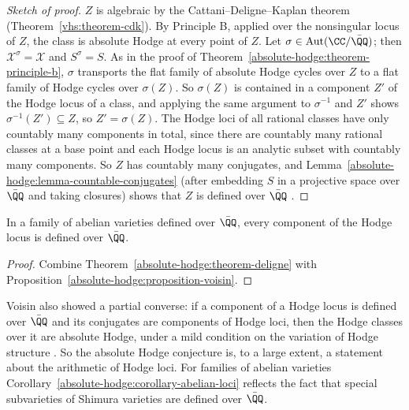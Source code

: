 \begin{proof}[Sketch of proof]
$Z$ is algebraic by the Cattani--Deligne--Kaplan theorem (Theorem~\ref{vhs:theorem-cdk}). By Principle B, applied over the nonsingular locus of $Z$, the class is absolute Hodge at every point of $Z$. Let
$\sigma \in \mathrm{Aut}(\CC/\bar{\QQ})$; then $\mathcal{X}^\sigma = \mathcal{X}$ and $S^\sigma = S$. As in the proof of Theorem~\ref{absolute-hodge:theorem-principle-b}, $\sigma$ transports the flat family of absolute
Hodge cycles over $Z$ to a flat family of Hodge cycles over $\sigma(Z)$. So $\sigma(Z)$ is contained in a component $Z'$ of the Hodge locus of a class, and applying the same argument to $\sigma^{-1}$ and $Z'$
shows $\sigma^{-1}(Z') \subseteq Z$, so $Z' = \sigma(Z)$. The Hodge loci of all rational classes have only countably many components in total, since there are countably many rational classes at a base point
and each Hodge locus is an analytic subset with countably many components. So $Z$ has countably many conjugates, and Lemma~\ref{absolute-hodge:lemma-countable-conjugates} (after embedding $S$ in a
projective space over $\bar{\QQ}$ and taking closures) shows that $Z$ is defined over $\bar{\QQ}$ \cite{voisin-2007}.
\end{proof}

\begin{corollary}\label{absolute-hodge:corollary-abelian-loci}
In a family of abelian varieties defined over $\bar{\QQ}$, every component of the Hodge locus is defined over $\bar{\QQ}$.
\end{corollary}

\begin{proof}
Combine Theorem~\ref{absolute-hodge:theorem-deligne} with Proposition~\ref{absolute-hodge:proposition-voisin}.
\end{proof}

\begin{remark}\label{absolute-hodge:remark-hodge-loci}
Voisin also showed a partial converse: if a component of a Hodge locus is defined over $\bar{\QQ}$ and its conjugates are components of Hodge loci, then the Hodge classes over it are absolute Hodge,
under a mild condition on the variation of Hodge structure \cite{voisin-2007}. So the absolute Hodge conjecture is, to a large extent, a statement about the arithmetic of Hodge loci. For families of
abelian varieties Corollary~\ref{absolute-hodge:corollary-abelian-loci} reflects the fact that special subvarieties of Shimura varieties are defined over $\bar{\QQ}$.
\end{remark}

